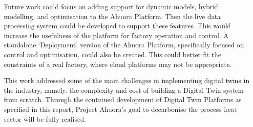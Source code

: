 Future work could focus on adding support for dynamic models, hybrid modelling, and optimisation to the Ahuora Platform. Then the live data processing system could be developed to support these features. 
This would increase the usefulness of the platform for factory operation and control. 
A standalone `Deployment' version of the Ahuora Platform, specifically focused on control and optimisation, could also be created. 
This could better fit the constraints of a real factory, where cloud platforms may not be appropriate.


This work addressed some of the main challenges in implementing digital twins in the industry, namely, the complexity and cost of building a Digital Twin system from scratch. Through the continued development of Digital Twin Platforms as specified in this report, Project Ahuora's goal to decarbonise the process heat sector will be fully realised.





